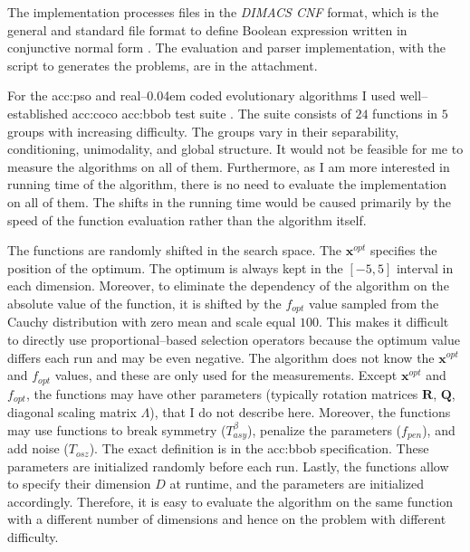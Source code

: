 The implementation processes files in the \textit{DIMACS CNF} format, which is the general and standard file format to define Boolean expression written in conjunctive normal form \citep{challenge1993satisfiability}. The evaluation and parser implementation, with the script to generates the problems, are in the attachment.

For the \acrlong{acc:pso} and real--\kern0.04em coded evolutionary algorithms I used well--established \acrfull{acc:coco} \acrfull{acc:bbob} test suite \citep{hansen2010comparing}. The suite consists of $24$ functions in $5$ groups with increasing difficulty. The groups vary in their separability, conditioning, unimodality, and global structure. It would not be feasible for me to measure the algorithms on all of them. Furthermore, as I am more interested in running time of the algorithm, there is no need to evaluate the implementation on all of them. The shifts in the running time would be caused primarily by the speed of the function evaluation rather than the algorithm itself.

\vspace{1em}

The functions are randomly shifted in the search space. The $\mathbf{x}^{opt}$ specifies the position of the optimum. The optimum is always kept in the $\left[-5,5\right]$ interval in each dimension. Moreover, to eliminate the dependency of the algorithm on the absolute value of the function, it is shifted by the $f_{opt}$ value sampled from the Cauchy distribution with zero mean and scale equal $100$. This makes it difficult to directly use proportional--based selection operators because the optimum value differs each run and may be even negative. The algorithm does not know the $\mathbf{x}^{opt}$ and $f_{opt}$ values, and these are only used for the measurements. Except $\mathbf{x}^{opt}$ and $f_{opt}$, the functions may have other parameters (typically rotation matrices $\mathbf{R}$, $\mathbf{Q}$, diagonal scaling matrix $\Lambda$), that I do not describe here. Moreover, the functions may use functions to break symmetry ($T_{asy}^\beta$), penalize the parameters ($f_{pen}$), and add noise ($T_{osz}$). The exact definition is in the \acrshort{acc:bbob} specification. These parameters are initialized randomly before each run. Lastly, the functions allow to specify their dimension $D$ at runtime, and the parameters are initialized accordingly. Therefore, it is easy to evaluate the algorithm on the same function with a different number of dimensions and hence on the problem with different difficulty.

